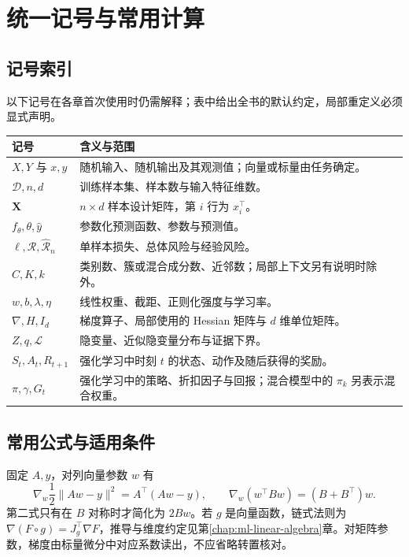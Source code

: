 \setcounter{chapter}{0} %
\chapter{统一记号与常用计算}
\label{app:ml-notation}

\section{记号索引}

以下记号在各章首次使用时仍需解释；表中给出全书的默认约定，局部重定义必须显式声明。
\begin{longtable}{@{}L{3.2cm}L{10.8cm}@{}}
  \toprule
  记号 & 含义与范围 \\
  \midrule
  \endhead
  $X,Y$ 与 $x,y$ & 随机输入、随机输出及其观测值；向量或标量由任务确定。\\
  $\mathcal D,n,d$ & 训练样本集、样本数与输入特征维数。\\
  $\mathbf X$ & $n\times d$ 样本设计矩阵，第 $i$ 行为 $x_i^\top$。\\
  $f_\theta,\theta,\widehat y$ & 参数化预测函数、参数与预测值。\\
  $\ell,\mathcal R,\widehat{\mathcal R}_n$ & 单样本损失、总体风险与经验风险。\\
  $C,K,k$ & 类别数、簇或混合成分数、近邻数；局部上下文另有说明时除外。\\
  $w,b,\lambda,\eta$ & 线性权重、截距、正则化强度与学习率。\\
  $\nabla,H,I_d$ & 梯度算子、局部使用的 Hessian 矩阵与 $d$ 维单位矩阵。\\
  $Z,q,\mathcal L$ & 隐变量、近似隐变量分布与证据下界。\\
  $S_t,A_t,R_{t+1}$ & 强化学习中时刻 $t$ 的状态、动作及随后获得的奖励。\\
  $\pi,\gamma,G_t$ & 强化学习中的策略、折扣因子与回报；混合模型中的 $\pi_k$ 另表示混合权重。\\
  \bottomrule
\end{longtable}

\section{常用公式与适用条件}

固定 $A,y$，对列向量参数 $w$ 有
\[
 \nabla_w\frac12\|Aw-y\|^2=A^\top(Aw-y),\qquad
 \nabla_w(w^\top Bw)=(B+B^\top)w.
\]
第二式只有在 $B$ 对称时才简化为 $2Bw$。若 $g$ 是向量函数，链式法则为 $\nabla(F\circ g)=J_g^\top\nabla F$，推导与维度约定见第\ref{chap:ml-linear-algebra}章。对矩阵参数，梯度由标量微分中对应系数读出，不应省略转置核对。

